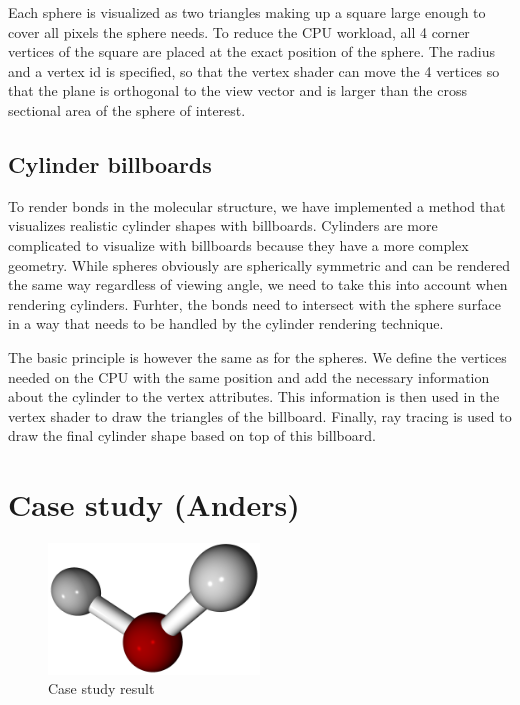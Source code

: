 \documentclass[aps,pre,twocolumn,letterpaper,floatfix,nofootinbib]{revtex4}
\begin{document}
Each sphere is visualized as two triangles making up a square large enough to
cover all pixels the sphere needs.
To reduce the CPU workload, all 4 corner vertices of the square are placed at
the exact position of the sphere.
The radius and a vertex id is specified, so that the vertex shader can move the
4 vertices so that the plane is orthogonal to the view vector and is larger than
the cross sectional area of the sphere of interest.

\subsection{Cylinder billboards}
%
To render bonds in the molecular structure, we have implemented a method that
visualizes realistic cylinder shapes with billboards.
Cylinders are more complicated to visualize with billboards because they have a
more complex geometry.
While spheres obviously are spherically symmetric and can be rendered the same
way regardless of viewing angle, we need to take this into account when
rendering cylinders.
Furhter, the bonds need to intersect with the sphere surface in a way that
needs to be handled by the cylinder rendering technique.

The basic principle is however the same as for the spheres.
We define the vertices needed on the CPU with the same position and add the
necessary information about the cylinder to the vertex attributes.
This information is then used in the vertex shader to draw the triangles of
the billboard.
Finally, ray tracing is used to draw the final cylinder shape based on top
of this billboard.



\section{Case study (Anders)}


\begin{figure}
	\centering
	\includegraphics[width=0.5\textwidth]{final_billboard.png}
	\caption{Case study result}
	\label{fig:gui}
\end{figure}
\end{document}
